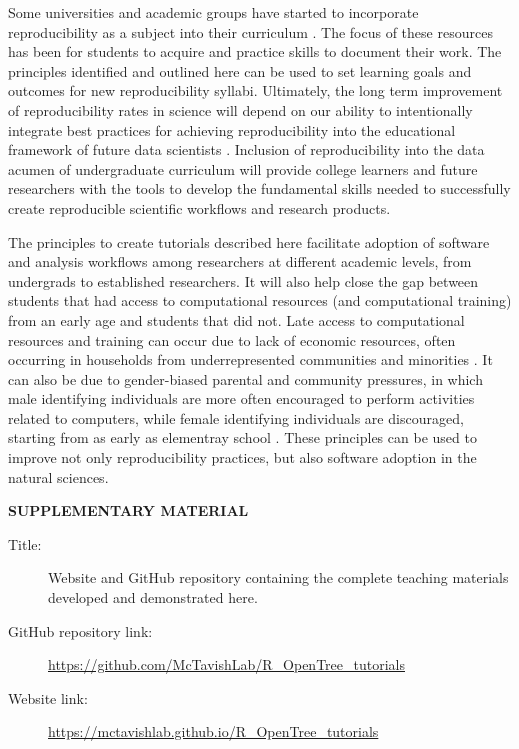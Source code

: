 \documentclass[12pt]{article}
\begin{document}
Some universities and academic groups have started to incorporate reproducibility as a subject into their curriculum
\citep{uwlibraries2022, nigms2022, psyteachr2022}.
The focus of these resources has been for students to acquire and practice skills to document their work.
The principles identified and outlined here can be used to set learning goals and outcomes for new reproducibility syllabi.
Ultimately, the long term improvement of reproducibility rates in science will depend on our ability to intentionally integrate best practices for achieving reproducibility into the educational framework of future data scientists \citep{nasem2018data}.
Inclusion of reproducibility into the data acumen of undergraduate curriculum will provide college learners and future researchers with the tools to develop the fundamental skills needed to successfully create reproducible scientific workflows and research products.


The principles to create tutorials described here facilitate adoption of software and analysis workflows among researchers at different academic levels, from undergrads to established researchers.
It will also help close the gap between students that had access to computational resources (and computational training) from an early age and students that did not.
Late access to computational resources and training can occur due to lack of economic resources, often occurring in households from underrepresented communities and minorities \citep{google2016diversity, warner2021quantifying}.
It can also be due to gender-biased parental and community pressures, in which male identifying individuals are more often encouraged to perform activities related to computers, while female identifying individuals are discouraged, starting from as early as elementray school \citep{master_gender_2021}.
These principles can be used to improve not only reproducibility practices, but also software adoption in the natural sciences.


\bigskip
\begin{center}
{\large\bf SUPPLEMENTARY MATERIAL}
\end{center}

\begin{description}

\item[Title:] Website and GitHub repository containing the complete teaching materials developed and demonstrated here.

\item[GitHub repository link:] \url{https://github.com/McTavishLab/R_OpenTree_tutorials}

\item[Website link:] \url{https://mctavishlab.github.io/R_OpenTree_tutorials}

\end{description}


\end{document}
